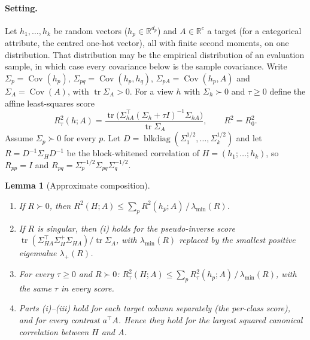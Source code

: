 \documentclass{article}
\newtheorem{lemma}{Lemma}
\DeclareMathOperator{\tr}{tr}
\begin{document}
\paragraph{Setting.} Let $h_1,\dots,h_k$ be random vectors ($h_p\in\mathbb R^{d_p}$) and $A\in\mathbb R^{c}$ a
target (for a categorical attribute, the centred one-hot vector), all with finite second moments, on one
distribution. That distribution may be the empirical distribution of an evaluation sample, in which case
every covariance below is the sample covariance. Write $\Sigma_p=\operatorname{Cov}(h_p)$,
$\Sigma_{pq}=\operatorname{Cov}(h_p,h_q)$, $\Sigma_{pA}=\operatorname{Cov}(h_p,A)$ and
$\Sigma_A=\operatorname{Cov}(A)$, with $\tr\Sigma_A>0$. For a view $h$ with $\Sigma_h\succ0$ and
$\tau\ge 0$ define the affine least-squares score
\[
R^2_\tau(h;A)=\frac{\tr\big(\Sigma_{hA}^{\top}(\Sigma_h+\tau I)^{-1}\Sigma_{hA}\big)}{\tr\Sigma_A},\qquad R^2=R^2_0 .
\]
Assume $\Sigma_p\succ0$ for every $p$. Let $D=\operatorname{blkdiag}(\Sigma_1^{1/2},\dots,\Sigma_k^{1/2})$ and
let $R=D^{-1}\Sigma_H D^{-1}$ be the block-whitened correlation of $H=(h_1;\dots;h_k)$, so $R_{pp}=I$ and
$R_{pq}=\Sigma_p^{-1/2}\Sigma_{pq}\Sigma_q^{-1/2}$.

\begin{lemma}[Approximate composition]
\begin{enumerate}
\item[(i)] If $R\succ0$, then $R^2(H;A)\le \sum_p R^2(h_p;A)\,/\,\lambda_{\min}(R)$.
\item[(ii)] If $R$ is singular, then (i) holds for the pseudo-inverse score
$\tr(\Sigma_{HA}^{\top}\Sigma_H^{+}\Sigma_{HA})/\tr\Sigma_A$, with $\lambda_{\min}(R)$ replaced by the smallest
positive eigenvalue $\lambda_+(R)$.
\item[(iii)] For every $\tau\ge0$ and $R\succ0$: $R^2_\tau(H;A)\le \sum_p R^2_\tau(h_p;A)\,/\,\lambda_{\min}(R)$,
with the \emph{same} $\tau$ in every score.
\item[(iv)] Parts (i)--(iii) hold for each target column separately (the per-class score), and for every
contrast $a^\top A$. Hence they hold for the largest squared canonical correlation between $H$ and $A$.
\end{enumerate}
\end{lemma}
\end{document}
